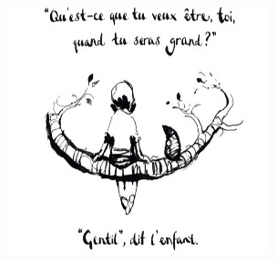 \documentclass[spanish]{textolivre}
\begin{document}
\begin{figure}[htbp]
\begin{minipage}[t]{0.32\textwidth}
 \label{fig5}
\end{minipage}
\\
\begin{minipage}[t]{0.32\textwidth}
\includegraphics[width=\linewidth]{Fig6.png}
 \label{fig6}
\end{minipage}
\hspace{1cm}
\begin{minipage}[t]{0.32\textwidth}

\end{minipage}
\end{figure}
\end{document}
